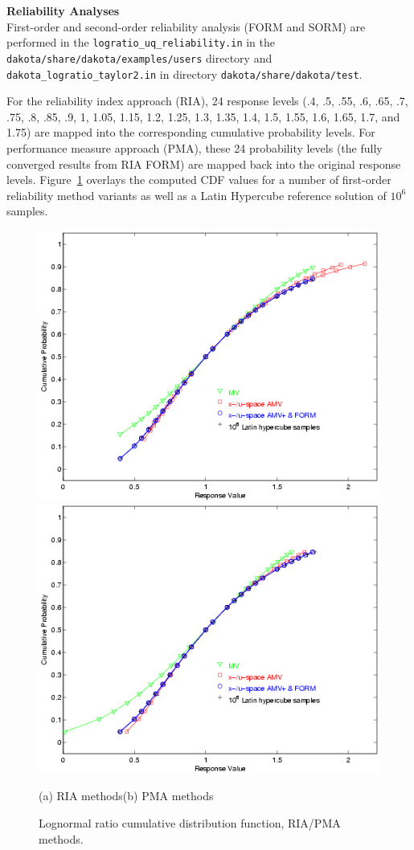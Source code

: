 {\bf Reliability Analyses} \\

First-order and second-order reliability analysis (FORM and SORM) are performed in the
\texttt{logratio\_uq\_reliability.in} in the {\tt dakota/share/dakota/examples/users}
 directory and \texttt{dakota\_logratio\_taylor2.in} in directory
{\tt dakota/share/dakota/test}.

For the reliability index approach (RIA),
24 response levels (.4, .5, .55,
.6, .65, .7, .75, .8, .85, .9, 1, 1.05, 1.15, 1.2, 1.25, 1.3, 1.35,
1.4, 1.5, 1.55, 1.6, 1.65, 1.7, and 1.75) are mapped into the
corresponding cumulative probability levels. For performance measure approach (PMA), these 24
probability levels (the fully converged results from RIA FORM) are
mapped back into the original response levels.
Figure~\ref{fig:log_ratio_cdf} overlays the computed CDF values for a
number of first-order reliability method variants as well as a Latin
Hypercube reference solution of $10^6$ samples.
\begin{figure}[hbp]
\centering
\centerline{\includegraphics[scale=0.5]{images/log_ratio_cdf_ria}
            \includegraphics[scale=0.5]{images/log_ratio_cdf_pma}}
(a) RIA methods\hspace{2.5in}(b) PMA methods
\caption{Lognormal ratio cumulative distribution function, RIA/PMA methods.}
\label{fig:log_ratio_cdf}
\end{figure}
